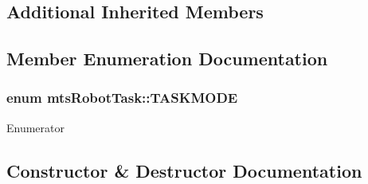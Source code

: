 \subsection*{Additional Inherited Members}


\subsection{Member Enumeration Documentation}
\hypertarget{classmts_robot_task_a923d3233420024307a4c7cd85e011486}{}
\subsubsection[{T\+A\+S\+K\+M\+O\+D\+E}]{\setlength{\rightskip}{0pt plus 5cm}enum {\bf mts\+Robot\+Task\+::\+T\+A\+S\+K\+M\+O\+D\+E}\hspace{0.3cm}{\ttfamily [protected]}}\label{classmts_robot_task_a923d3233420024307a4c7cd85e011486}
\begin{Desc}
\item[Enumerator]\par
\begin{description}
\item[{\em 
\hypertarget{classmts_robot_task_a923d3233420024307a4c7cd85e011486a254870bb4f75421d28f48a18be4c4302}{}J\+P\+O\+S\label{classmts_robot_task_a923d3233420024307a4c7cd85e011486a254870bb4f75421d28f48a18be4c4302}
}]\item[{\em 
\hypertarget{classmts_robot_task_a923d3233420024307a4c7cd85e011486ab57992254d70c5470dd70451d7060500}{}J\+V\+E\+L\label{classmts_robot_task_a923d3233420024307a4c7cd85e011486ab57992254d70c5470dd70451d7060500}
}]\end{description}
\end{Desc}


\subsection{Constructor \& Destructor Documentation}
\hypertarget{classmts_robot_task_a979f05490a614e5c8f5fac858d9df124}{}
